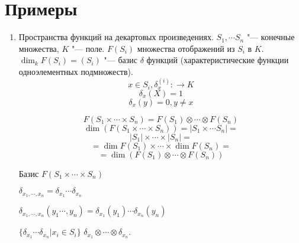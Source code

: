 ﻿\section{Примеры}
\begin{enumerate}
    \item Пространства функций на декартовых произведениях. 
    $S_1, \cdots S_n$ "--- конечные множества, $K$ "--- поле. 
    $F(S_i)$ множества отображений из $S_i$ в $K$.
    $\dim_k F(S_i) = (S_i)$ "--- базис $\delta$ функций (характеристические функции одноэлементных подмножеств).
    $$x \in S_i, \delta_{x}^{(i)} \colon \to K$$
    $$\delta_{x}(X) = 1$$
    $$\delta_{x}(y) = 0, y \ne x$$

    $$F(S_1 \times \cdots \times S_n) = F(S_1) \otimes \cdots \otimes F(S_n)$$
    $$\dim(F(S_1 \times \cdots \times S_n)) = |S_1 \times \cdots S_n| = $$
    $$|S_1| \times \cdots \times |S_n| = $$
    $$= \dim F(S_1) \times \cdots \times \dim F(S_n) = $$
    $$= \dim (F(S_1) \otimes \cdots \otimes F(S_n))$$

    Базис $F(S_1 \times \cdots \times S_n)$

    $\delta_{x_1, \cdots, x_n} = \delta_{x_1} \cdots \delta_{x_n}$

    $\delta_{x_1, \cdots, x_n}(y_1 \cdots, y_n) = \delta_{x_1}(y_1) \cdots \delta_{x_n}(y_n)$

    $\{\delta_{x_1} \cdots \delta_{x_n}| x_i \in S_i\}$ 
    $\delta_{x_1} \otimes \cdots \otimes \delta_{x_n}$. 
\end{enumerate}